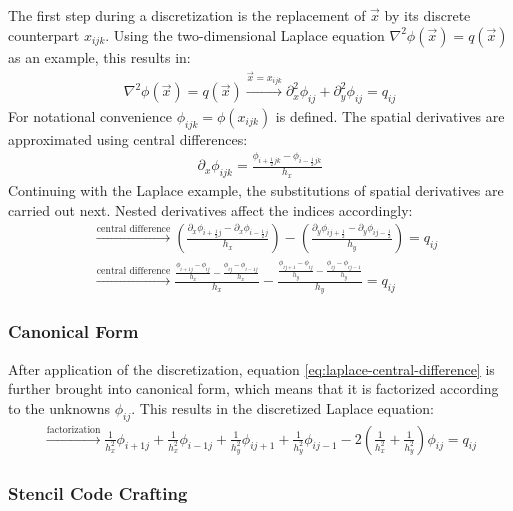 The first step during a discretization is the replacement of $\vec{x}$ by its discrete counterpart $x_{ijk}$. Using the two-dimensional Laplace equation $\nabla^2\phi(\vec{x})=q(\vec{x})$ as an example, this results in:
\begin{align*}
\nabla^2\phi\left(\vec{x}\right)=q\left(\vec{x}\right)
\xrightarrow{\vec{x} = x_{ijk}}
\partial_x^2\phi_{ij}+
\partial_y^2\phi_{ij}
=
q_{ij}
\end{align*}
For notational convenience $\phi_{ijk} = \phi\left(x_{ijk}\right)$ is defined. The spatial derivatives are approximated using central differences:
\begin{align}
\partial_x\phi_{ijk} = \frac{\phi_{i+\frac{1}{2}jk} - \phi_{i-\frac{1}{2}jk}}{h_x}
\label{eq:pn_solver_central_difference}
\end{align}
Continuing with the Laplace example, the substitutions of spatial derivatives are carried out next. Nested derivatives affect the indices accordingly:
\begin{align}
&
\xrightarrow{\text{central difference}}
\left(
\frac
{
\partial_x
\phi_{i+\frac{1}{2}j}
-
\partial_x
\phi_{i-\frac{1}{2}j}
}
{h_x}
\right)
-
\left(
\frac
{
\partial_y
\phi_{ij+\frac{1}{2}}
-
\partial_y
\phi_{ij-\frac{1}{2}}
}
{h_y}
\right)
=
q_{ij}
\nonumber
\\
&
\xrightarrow{\text{central difference}}
\frac
{
\frac{\phi_{i+1j} - \phi_{ij}}{h_x}
-
\frac{\phi_{ij} - \phi_{i-1j}}{h_x}
}
{h_x}
-
\frac
{
\frac{\phi_{ij+1} - \phi_{ij}}{h_y}
-
\frac{\phi_{ij} - \phi_{ij-1}}{h_y}
}
{h_y}
=
q_{ij}
\label{eq:laplace-central-difference}
\end{align}

\subsubsection*{Canonical Form}
After application of the discretization, equation \ref{eq:laplace-central-difference} is further brought into canonical form, which means that it is factorized according to the unknowns $\phi_{ij}$. This results in the discretized Laplace equation:
\begin{align}
\xrightarrow{\text{factorization}}
\frac{1}{h_x^2}\phi_{i+1j}
+\frac{1}{h_x^2}\phi_{i-1j}
+\frac{1}{h_y^2}\phi_{ij+1}
+\frac{1}{h_y^2}\phi_{ij-1}
-2\left(\frac{1}{h_x^2}+\frac{1}{h_y^2}\right)\phi_{ij}
=
q_{ij}
\label{eq:pn_laplace_canonical_form}
\end{align}

\subsubsection*{Stencil Code Crafting}

